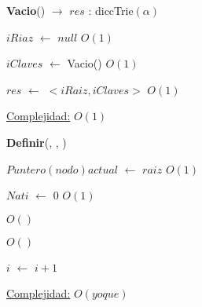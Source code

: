 \begin{Algoritmos}
  
  
\begin{algorithm}[H]
{\textbf{Vacio}() $\to$ $res$ : diccTrie$(\alpha)$}
\begin{algorithmic}[1]

\State $iRiaz$ $\gets $ $null$  \Comment $O(1)$
 
\State $iClaves$ $\gets$ Vacio() \Comment $O(1)$

\State $res$ $\gets$ $<iRaiz, iClaves>$ \Comment $O(1)$

\medskip
\State \underline{Complejidad:} $O(1)$

\end{algorithmic}
\end{algorithm}
  


\begin{algorithm}[H]
{\textbf{Definir}(, , )}
\begin{algorithmic}[1]

\State $Puntero(nodo) actual$ $\gets$ $raiz$ \Comment $O(1)$

\State $Nat i$ $\gets$ $0$ \Comment $O(1)$

   \Comment $O()$
	
	 \Comment $O()$
		
		
	
	\EndIf

	\State $i$ $\gets$ $i + 1$
\EndWhile 


\medskip
\State \underline{Complejidad:} $O(yoque)$

\end{algorithmic}
\end{algorithm}  
  
  
\end{Algoritmos}


